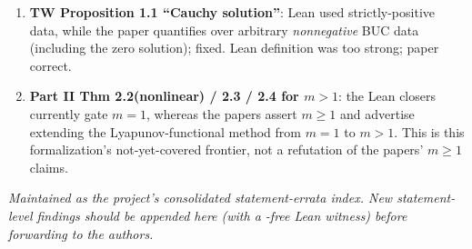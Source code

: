 \documentclass[11pt]{article}
\newcommand{\Om}{\Omega}
\newcommand{\code}[1]{\texttt{\seqsplit{#1}}}
\begin{document}
\begin{enumerate}[leftmargin=1.6em,itemsep=2pt]
  positivity as open-interior pointwise positivity (admitting $\inf=0$), while the
  papers' (1.11)/(1.8) require the uniform floor $\inf_\Om u_0>0$. The \emph{paper
  hypothesis is correct}; the Lean predicate was too weak (now fixed). TW stated
  positivity correctly.
\item \textbf{TW Proposition 1.1 ``Cauchy solution''}: Lean used strictly-positive
  data, while the paper quantifies over arbitrary \emph{nonnegative} BUC data
  (including the zero solution); fixed. Lean definition was too strong; paper
  correct.
\item \textbf{Part II Thm 2.2(nonlinear) / 2.3 / 2.4 for $m>1$}: the Lean closers
  currently gate $m=1$, whereas the papers assert $m\ge1$ and advertise extending
  the Lyapunov-functional method from $m=1$ to $m>1$. This is this formalization's
  not-yet-covered frontier, not a refutation of the papers' $m\ge1$ claims.
\end{enumerate}

\vfill
\noindent\footnotesize\emph{Maintained as the project's consolidated
statement-errata index. New statement-level findings should be appended here (with
a \code{sorry}-free Lean witness) before forwarding to the authors.}
\end{document}
